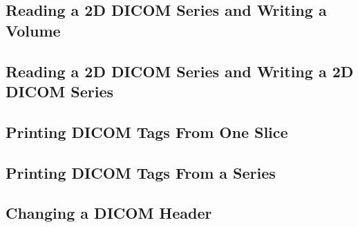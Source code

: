 \subsection{Reading a 2D DICOM Series and Writing a Volume}
\label{DicomSeriesReadImageWrite2}


\subsection{Reading a 2D DICOM Series and Writing a 2D DICOM Series}
\label{DicomSeriesReadSeriesWrite}


\subsection{Printing DICOM Tags From One Slice}
\label{DicomImageReadPrintTags}


\subsection{Printing DICOM Tags From a Series}
\label{DicomSeriesReadPrintTags}


\subsection{Changing a DICOM Header}
\label{DicomImageReadChangeHeaderWrite}




